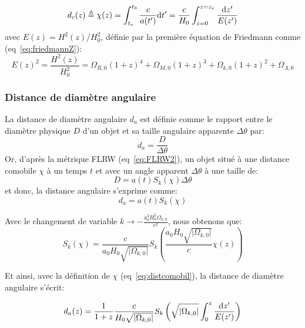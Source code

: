 \documentclass[../main/main.tex]{subfiles}
\begin{document}
\begin{equation}
  \label{eq:distcomobil}
  d_{c}(z)\triangleq\chi(z)=\int^{t_{0}}_{t_{e}}\frac{c}{a(t')}\mathrm{d}
  t'=\frac{c}{H_{0}}\int_{z=0}^{z=z_{e}}\frac{\mathrm{d} z'}{E(z')}
\end{equation}
avec $E(z)=H^{2}(z)/H_{0}^{2}$, définie par la première équation de
Friedmann comme (eq~\ref{eq:friedmannZ}):
\begin{equation}
  \label{eq:Ez}
  E(z)^{2}=\frac{H^{2}(z)}{H_{0}^{2}}=\Omega_{R,0}(1+z)^{4}
  +\Omega_{M,0}(1+z)^{3} +\Omega_{k,0}(1+z)^{2}+\Omega_{\Lambda,0}
\end{equation}

\subsubsection*{Distance de diamètre angulaire}

La distance de diamètre angulaire $d_{a}$ est définie comme le rapport entre le
diamètre physique $D$ d'un objet et sa taille angulaire apparente
$\Delta\theta$ par:
\begin{equation}
  \label{eq:angulardist1}
  d_{a}=\frac{D}{\Delta\theta}
\end{equation}
Or, d'après la métrique FLRW (eq~\ref{eq:FLRW2}), un objet situé à une
distance comobile $\chi$ à un temps $t$ et avec un angle apparent
$\Delta\theta$ à une taille de:
\begin{equation}
  \label{eq:tailleangulardist}
  D = a(t)S_{k}(\chi)\Delta\theta
\end{equation}
et donc, la distance angulaire s'exprime comme:
\begin{equation}
  \label{eq:angulardist2}
  d_{a}=a(t)S_{k}(\chi)
\end{equation}

Avec le changement de variable $k\rightarrow
-\frac{a_{0}^{2}H_{0}^{2}\Omega_{k,0}}{c^{2}}$, nous obtenons que:
\begin{equation}
  \label{eq:43}
  S_{k}(\chi) = \frac{c}{a_{0}H_{0}\sqrt{\lvert\Omega_{k,0}\rvert}}S_{k}\left(\frac{a_{0}H_{0}\sqrt{\lvert\Omega_{k,0}\rvert}}{c}\chi(z)\right)
\end{equation}

Et ainsi, avec la définition de $\chi$ (eq~\ref{eq:distcomobil}), la
distance de diamètre angulaire s'écrit:

\begin{equation}
  \label{eq:distangulargen}
  d_{a}(z)=\frac{1}{1+z}\frac{c}{H_{0}\sqrt{\lvert\Omega_{k,0}\rvert}}S_{k}\left(\sqrt{\lvert\Omega_{k,0}\rvert}\int_{0}^{z}\frac{\mathrm{d} z'}{E(z')}\right)
\end{equation}
\end{document}
